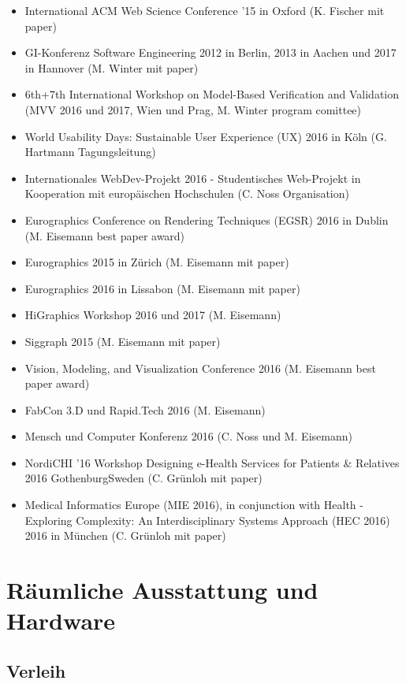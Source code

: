 \begin{itemize}
\tightlist
\item
  International ACM Web Science Conference '15 in Oxford (K. Fischer mit
  paper)
\item
  GI-Konferenz Software Engineering 2012 in Berlin, 2013 in Aachen und
  2017 in Hannover (M. Winter mit paper)
\item
  6th+7th International Workshop on Model-Based Verification and
  Validation (MVV 2016 und 2017, Wien und Prag, M. Winter program
  comittee)
\item
  World Usability Days: Sustainable User Experience (UX) 2016 in Köln
  (G. Hartmann Tagungsleitung)
\item
  Internationales WebDev-Projekt 2016 - Studentisches Web-Projekt in
  Kooperation mit europäischen Hochschulen (C. Noss Organisation)
\item
  Eurographics Conference on Rendering Techniques (EGSR) 2016 in Dublin
  (M. Eisemann best paper award)
\item
  Eurographics 2015 in Zürich (M. Eisemann mit paper)
\item
  Eurographics 2016 in Lissabon (M. Eisemann mit paper)
\item
  HiGraphics Workshop 2016 und 2017 (M. Eisemann)
\item
  Siggraph 2015 (M. Eisemann mit paper)
\item
  Vision, Modeling, and Visualization Conference 2016 (M. Eisemann best
  paper award)
\item
  FabCon 3.D und Rapid.Tech 2016 (M. Eisemann)
\item
  Mensch und Computer Konferenz 2016 (C. Noss und M. Eisemann)
\item
  NordiCHI '16 Workshop Designing e-Health Services for Patients \&
  Relatives 2016 GothenburgSweden (C. Grünloh mit paper)
\item
  Medical Informatics Europe (MIE 2016), in conjunction with Health -
  Exploring Complexity: An Interdisciplinary Systems Approach (HEC 2016)
  2016 in München (C. Grünloh mit paper)
\end{itemize}

\section{Räumliche Ausstattung und
Hardware}\label{ruxe4umliche-ausstattung-und-hardware}

\subsection{Verleih}\label{verleih}

